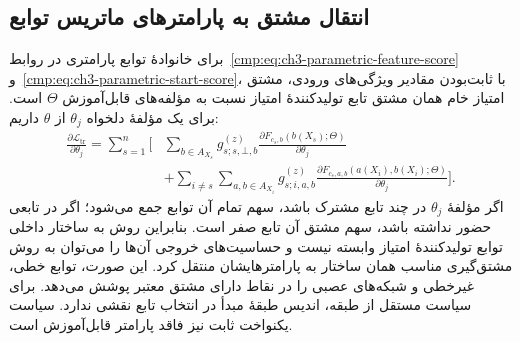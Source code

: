 \subsection{انتقال مشتق به پارامترهای ماتریس توابع}
\label{app:ch3-gradient-parametric-functions}

برای خانوادهٔ توابع پارامتری در
روابط~\eqref{cmp:eq:ch3-parametric-feature-score}
و~\eqref{cmp:eq:ch3-parametric-start-score}،
با ثابت‌بودن مقادیر ویژگی‌های ورودی، مشتق
امتیاز خام همان مشتق تابع تولیدکنندهٔ
امتیاز نسبت به مؤلفه‌های قابل‌آموزش
$\Theta$ است. برای یک مؤلفهٔ دلخواه
$\theta_j$ از $\theta$ داریم:
\[
\begin{aligned}
\frac{\partial\mathcal L_{\mathrm{tr}}}{\partial\theta_j}
=\sum_{s=1}^{n}\Bigg[
&\sum_{b\in A_{X_s}}g_{s;s,\bot,b}^{(z)}
\frac{\partial F_{c_s,b}
(b(X_s);\Theta)}{\partial\theta_j}\\
&+\sum_{i\ne s}\sum_{a,b\in A_{X_i}}
g_{s;i,a,b}^{(z)}
\frac{\partial F_{c_s,a,b}
(a(X_i),b(X_i);\Theta)}{\partial\theta_j}
\Bigg].
\end{aligned}
\]
اگر مؤلفهٔ $\theta_j$ در چند تابع مشترک
باشد، سهم تمام آن توابع جمع می‌شود؛ اگر
در تابعی حضور نداشته باشد، سهم مشتق آن
تابع صفر است. بنابراین روش به ساختار
داخلی توابع تولیدکنندهٔ امتیاز وابسته نیست
و حساسیت‌های خروجی آن‌ها را می‌توان
به روش مشتق‌گیری مناسب همان ساختار
به پارامترهایشان منتقل کرد. این صورت،
توابع خطی، غیرخطی و شبکه‌های عصبی را
در نقاط دارای مشتق معتبر پوشش می‌دهد.
برای سیاست مستقل از طبقه، اندیس طبقهٔ
مبدأ در انتخاب تابع نقشی ندارد. سیاست
یکنواخت ثابت نیز فاقد پارامتر قابل‌آموزش
است.
